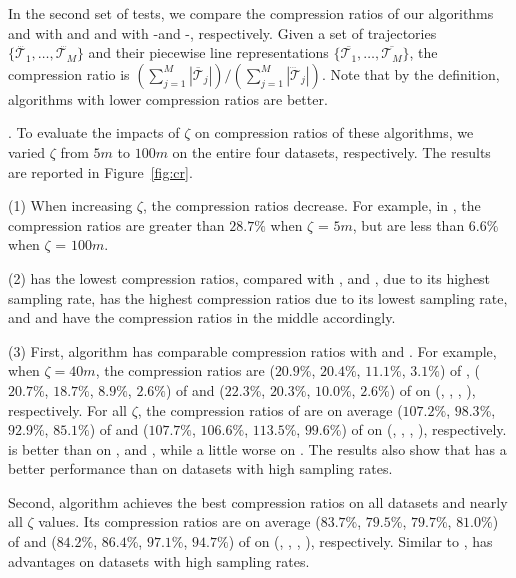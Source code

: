 In the second set of tests, we compare the compression ratios of our algorithms \operb and \operba with \dpa and \fbqsa
and with -\operb and -\operba, respectively.
Given a set of trajectories $\{\dddot{\mathcal{T}_1}, \ldots, \dddot{\mathcal{T}_M}\}$ and their piecewise line representations
$\{\overline{\mathcal{T}_1}, \ldots, \overline{\mathcal{T}_M}\}$,
 the compression ratio is $(\sum_{j=1}^{M} |\overline{\mathcal{T}}_j |)/(\sum_{j=1}^{M} |\dddot{\mathcal{T}}_j |)$.
 Note that by the definition, algorithms with lower compression ratios are better.




.
To evaluate the impacts of $\zeta$ on compression ratios of these algorithms, we varied $\zeta$ from $5m$ to $100m$ on
 the entire four datasets, respectively.
The results are reported in Figure~\ref{fig:cr}.

\sstab (1) When increasing $\zeta$, the compression ratios decrease. For example, in \sercar,
the compression ratios are greater than $28.7\%$ when $\zeta$ = $5m$, but are less than $6.6\%$ when $\zeta$ = $100m$.

\sstab (2) \geolife has the lowest compression ratios, compared with \taxi, \truck and \sercar,
due to its highest sampling rate, \taxi has the highest compression ratios due to its lowest sampling rate, and \truck and \sercar have the compression ratios in the middle accordingly.

\sstab (3) {First, algorithm \operb has comparable compression ratios with \fbqsa and \dpa.
For example, when $\zeta = 40m$, the compression ratios are ($20.9\%$, $20.4\%$, $11.1\%$, $3.1\%$) of \fbqsa, ($20.7\%$, $18.7\%$, $8.9\%$, $2.6\%$) of \dpa and ($22.3\%$, $20.3\%$, $10.0\%$, $2.6\%$) of \operb on (\taxi, \truck, \sercar, \geolife), respectively.
For all $\zeta$, the compression ratios of \operb are on average ($107.2\%$, $98.3\%$, $92.9\%$, {$85.1\%$}) of \fbqsa and ($107.7\%$, $106.6\%$, $113.5\%$, $99.6\%$) of \dpa on (\taxi, \truck, \sercar, \geolife), respectively.
\operb is better than  \fbqsa on \truck, \sercar and \geolife, while a little worse on \taxi. The results also show that \operb has a better performance than \fbqsa on datasets with high sampling rates.}

\ni Second, algorithm \operba achieves the best compression ratios on all datasets and nearly all $\zeta$ values.
Its compression ratios are on average ($83.7\%$, $79.5\%$, $79.7\%$, $81.0\%$) of \fbqsa and ($84.2\%$, $86.4\%$, $97.1\%$, $94.7\%$) of \dpa on (\taxi, \truck, \sercar, \geolife), respectively.
Similar to \operb, \operba has advantages on datasets with high sampling rates.


